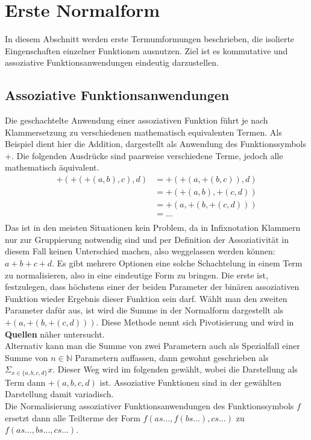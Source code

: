 \documentclass{article}
\begin{document}
\section {Erste Normalform}
In diesem Abschnitt werden erste Termumformungen beschrieben, die isolierte Eingenschaften einzelner Funktionen ausnutzen. Ziel ist es kommutative und assoziative Funktionsanwendungen eindeutig darzustellen.\\

\subsection {Assoziative Funktionsanwendungen}
Die geschachtelte Anwendung einer assoziativen Funktion führt je nach Klammersetzung zu verschiedenen mathematisch equivalenten Termen. Als Beispiel dient hier die Addition, dargestellt als Anwendung des Funktionssymbols $+$. Die folgenden Ausdrücke sind paarweise verschiedene Terme, jedoch alle mathematisch äquivalent.
\begin{equation}
	\begin{split}
	+(+(+(a, b), c), d) &= +(+(a, +(b, c)), d)\\
	&= +(+(a, b), +(c, d))\\
	&= +(a, +(b, +(c, d)))\\
	&= \dots \\
	\end{split}
\end{equation}
Das ist in den meisten Situationen kein Problem, da in Infixnotation Klammern nur zur Gruppierung notwendig sind und per Definition der Assoziativität in diesem Fall keinen Unterschied machen, also weggelassen werden können: $a + b + c + d$. Es gibt mehrere Optionen eine solche Schachtelung in einem Term zu normalisieren, also in eine eindeutige Form zu bringen. Die erste ist, festzulegen, dass höchstens einer der beiden Parameter der binären assoziativen Funktion wieder Ergebnis dieser Funktion sein darf. Wählt man den zweiten Parameter dafür aus, ist wird die Summe in der Normalform dargestellt als $+(a, +(b, +(c, d)))$. Diese Methode nennt sich Pivotisierung und wird in \textbf{Quellen} näher untersucht.\\
Alternativ kann man die Summe von zwei Parametern auch als Spezialfall einer Summe von $n \in \mathbb{N}$ Parametern auffassen, dann gewohnt geschrieben als $\Sigma_{x \in \{a, b, c, d\}} x$. Dieser Weg wird im folgenden gewählt, wobei die Darstellung als Term dann $+(a, b, c, d)$ ist. Assoziative Funktionen sind in der gewählten Darstellung damit variadisch. \\
Die Normalisierung assoziativer Funktionsanwendungen des Funktionssymbols $f$ ersetzt dann alle Teilterme der Form $f(as..., f(bs...), cs...)$ zu $f(as..., bs..., cs...)$.
\end{document}
